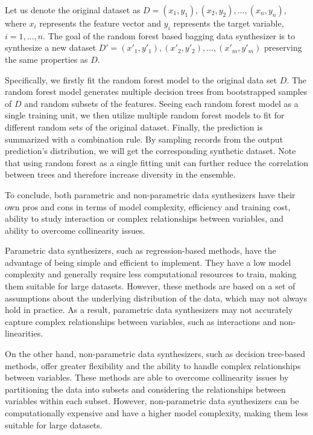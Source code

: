 Let us denote the original dataset as $D = { (x_1,y_1),(x_2,y_2),\dots,(x_n,y_n)}$, where $x_i$ represents the feature vector and $y_i$ represents the target variable, $i=1,...,n$. The goal of the random forest based bagging data synthesizer is to synthesize a new dataset $D' = { (x'_1,y'_1),(x'_2,y'_2),\dots,(x'_m,y'_m)}$ preserving the same properties as $D$.

Specifically, we firstly fit the random forest model to the original data set $D$. The random forest model generates multiple decision trees from bootstrapped samples of $D$ and random subsets of the features. Seeing each random forest model as a single training unit, we then utilize multiple random forest models to fit for different random sets of the original dataset. Finally, the prediction is summarized with a combination rule. By sampling records from the output prediction's distribution, we will get the corresponding synthetic dataset. Note that using random forest as a single fitting unit can further reduce the correlation between trees and therefore increase diversity in the ensemble.

To conclude, both parametric and non-parametric data synthesizers have their own pros and cons in terms of model complexity, efficiency and training cost, ability to study interaction or complex relationships between variables, and ability to overcome collinearity issues.

Parametric data synthesizers, such as regression-based methods, have the advantage of being simple and efficient to implement. They have a low model complexity and generally require less computational resources to train, making them suitable for large datasets. However, these methods are based on a set of assumptions about the underlying distribution of the data, which may not always hold in practice. As a result, parametric data synthesizers may not accurately capture complex relationships between variables, such as interactions and non-linearities.

On the other hand, non-parametric data synthesizers, such as decision tree-based methods, offer greater flexibility and the ability to handle complex relationships between variables. These methods are able to overcome collinearity issues by partitioning the data into subsets and considering the relationships between variables within each subset. However, non-parametric data synthesizers can be computationally expensive and have a higher model complexity, making them less suitable for large datasets.

